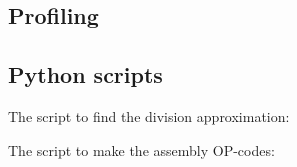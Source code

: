 \documentclass[12pt,a4paper]{article}
\begin{document}
\subsection{Profiling}
	\label{toggle_full}	
	

\subsection{Python scripts}
	The script to find the division approximation:
	\label{div30approx}
	
	
	The script to make the assembly OP-codes:
	\label{assembler}
	
\end{document}
